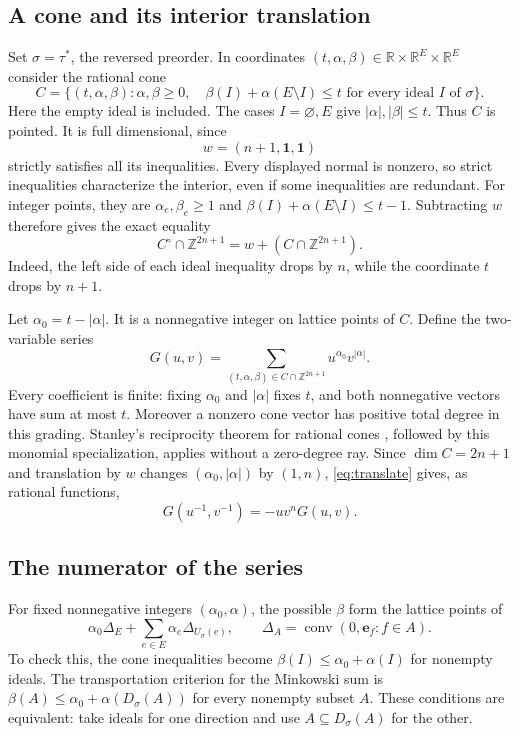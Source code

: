 \documentclass[11pt]{article}
\newcommand{\Z}{\mathbb Z}
\begin{document}
\subsection*{A cone and its interior translation}
Set $\sigma=\tau^*$, the reversed preorder. In coordinates
$(t,\alpha,\beta)\in\mathbb R\times\mathbb R^E\times\mathbb R^E$
consider the rational cone
\begin{equation}\label{eq:cone}
 C=\{(t,\alpha,\beta):\alpha,\beta\ge0,\quad
       \beta(I)+\alpha(E\setminus I)\le t
                    \text{ for every ideal $I$ of $\sigma$}\}.
\end{equation}
Here the empty ideal is included. The cases $I=\varnothing,E$
give $|\alpha|,|\beta|\le t$. Thus $C$ is pointed. It is full
dimensional, since
\[
 w=(n+1,\mathbf1,\mathbf1)
\]
strictly satisfies all its inequalities. Every displayed normal
is nonzero, so strict inequalities characterize the interior, even
if some inequalities are redundant. For integer points, they are
$\alpha_e,\beta_e\ge1$ and
$\beta(I)+\alpha(E\setminus I)\le t-1$.
Subtracting $w$ therefore gives the exact equality
\begin{equation}\label{eq:translate}
 C^\circ\cap\Z^{2n+1}=w+(C\cap\Z^{2n+1}).
\end{equation}
Indeed, the left side of each ideal inequality drops by $n$, while
the coordinate $t$ drops by $n+1$.

Let $\alpha_0=t-|\alpha|$. It is a nonnegative integer on lattice
points of $C$. Define the two-variable series
\[
 G(u,v)=\sum_{(t,\alpha,\beta)\in C\cap\Z^{2n+1}}
                                u^{\alpha_0}v^{|\alpha|}.
\]
Every coefficient is finite: fixing $\alpha_0$ and $|\alpha|$
fixes $t$, and both nonnegative vectors have sum at most $t$.
Moreover a nonzero cone vector has positive total degree in this
grading. Stanley's reciprocity theorem for rational cones
\cite[Theorem 1]{BD}, followed by this monomial specialization,
applies without a zero-degree ray. Since $\dim C=2n+1$ and
translation by $w$ changes $(\alpha_0,|\alpha|)$ by $(1,n)$,
\eqref{eq:translate} gives, as rational functions,
\begin{equation}\label{eq:Grec}
 G(u^{-1},v^{-1})=-u v^n G(u,v).
\end{equation}

\subsection*{The numerator of the series}
For fixed nonnegative integers $(\alpha_0,\alpha)$, the possible
$\beta$ form the lattice points of
\begin{equation}\label{eq:section}
 \alpha_0\Delta_E+
       \sum_{e\in E}\alpha_e\Delta_{U_\sigma(e)},\qquad
 \Delta_A=\operatorname{conv}(0,\mathbf e_f:f\in A).
\end{equation}
To check this, the cone inequalities become
$\beta(I)\le\alpha_0+\alpha(I)$ for nonempty ideals.
The transportation criterion for the Minkowski sum is
$\beta(A)\le\alpha_0+\alpha(D_\sigma(A))$ for every nonempty
subset $A$. These conditions are equivalent: take ideals for one
direction and use $A\subseteq D_\sigma(A)$ for the other.
\end{document}
